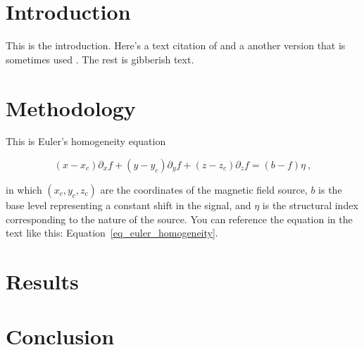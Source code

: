 \section{Introduction}

This is the introduction. Here's a text citation of \citet{OliveiraJr2015}
and a another version that is sometimes used \citep{OliveiraJr2015}.
The rest is gibberish text.

\lipsum[1-6]


\section{Methodology}

This is Euler's homogeneity equation

\begin{equation}
  \label{eq_euler_homogeneity}
  (x - x_c)\partial_x f + (y - y_c)\partial_y f + (z - z_c)\partial_z f
  = (b - f)\eta
  \ ,
\end{equation}

\noindent
in which $(x_c, y_c, z_c)$ are the coordinates of the magnetic field source,
$b$ is the base level representing a constant shift in the signal, and $\eta$
is the structural index corresponding to the nature of the source. You can
reference the equation in the text like this:
Equation~\ref{eq_euler_homogeneity}.

\lipsum[10-16]


\section{Results}



\lipsum[5-10]


\section{Conclusion}

\lipsum[1-5]


